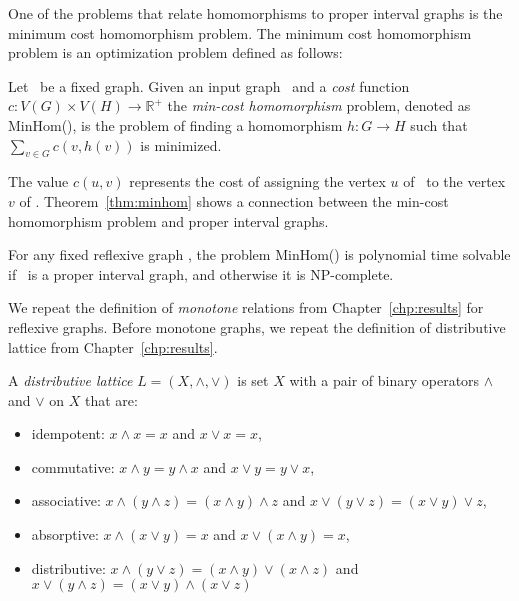 One of the problems that relate homomorphisms to proper interval graphs is the minimum cost homomorphism problem.
The minimum cost homomorphism problem is an optimization problem defined as follows:

\begin{defi} [MinHom]
Let \mH\ be a fixed graph. Given an input graph \mG\ and a \emph{cost} function
\(c: V(G) \times V(H) \to \mathbb{R}^+\) the \emph{min-cost homomorphism} problem,
denoted as MinHom(\mH), is the problem of finding a homomorphism 
\(h:G\to H\) such that \(\sum_{v\in G} c(v, h(v))\) is minimized.
\end{defi}

The value \(c(u,v)\) represents the cost of assigning the vertex \(u\) of \mG\ to the vertex \(v\) of \mH\@.
Theorem~\ref{thm:minhom} shows a connection between the min-cost homomorphism problem 
and proper interval graphs.

\begin{theorem}  \label{thm:minhom}
For any fixed reflexive graph \mH, the problem MinHom(\mH) is polynomial time solvable if
\mH\ is a proper interval graph, and otherwise it is NP-complete.
\end{theorem}

We repeat the definition of \emph{monotone} relations from Chapter~\ref{chp:results}
for reflexive graphs. Before monotone graphs, we repeat the definition of distributive lattice from Chapter~\ref{chp:results}\@.

\begin{defi} 
A \emph{distributive lattice} \(L=(X,\wedge,\vee)\) is set \(X\) with a pair of binary operators \(\wedge\)
and \(\vee\) on \(X\) that are:
\begin{itemize}
\item idempotent: \(x \wedge x = x\) and \(x \vee x = x\),
\item commutative: \(x \wedge y = y \wedge x\) and \(x \vee y = y \vee x\),
\item associative: \(x \wedge (y \wedge z) = (x \wedge y) \wedge z\) and 
\(x \vee (y \vee z) = (x \vee y) \vee z\),
\item absorptive: \(x \wedge (x\vee y) = x\) and \(x \vee (x \wedge y) = x\),
\item distributive: \(x \wedge (y \vee z) = (x \wedge y) \vee (x \wedge z)\) and
\(x \vee (y \wedge z) = (x \vee y) \wedge (x \vee z)\)
\end{itemize}
\end{defi}

